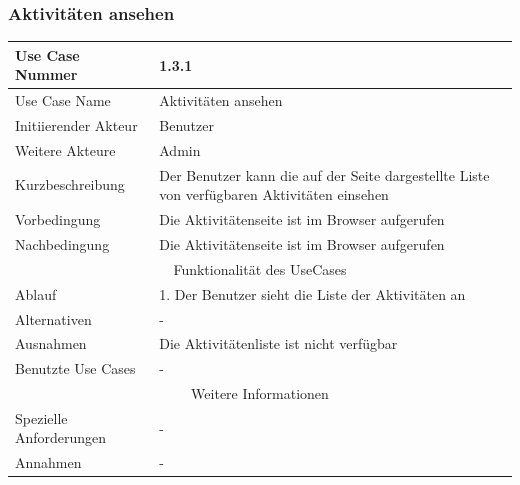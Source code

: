 \documentclass[10pt,a4paper]{article}
\begin{document}
	\subsubsection{Aktivit\"aten ansehen}
	\begin{tabular}{|l|p{.5\linewidth}|}
	\hline Use Case Nummer & 1.3.1 \\ 
	\hline Use Case Name & Aktivit\"aten ansehen \\ 
	\hline Initiierender Akteur & Benutzer \\
	\hline Weitere Akteure & Admin \\
	\hline Kurzbeschreibung & Der Benutzer kann die auf der Seite dargestellte Liste von verf\"ugbaren Aktivit\"aten einsehen \\
	\hline Vorbedingung & Die Aktivit\"atenseite ist im Browser aufgerufen \\
	\hline Nachbedingung & Die Aktivit\"atenseite ist im Browser aufgerufen \\
	\hline \multicolumn{2}{|c|}{Funktionalität des UseCases}\\
	\hline Ablauf & 1. Der Benutzer sieht die Liste der Aktivit\"aten an \\
	\hline Alternativen & - \\
	\hline Ausnahmen & Die Aktivit\"atenliste ist nicht verf\"ugbar \\
	\hline Benutzte Use Cases & - \\
	\hline \multicolumn{2}{|c|}{Weitere Informationen} \\
	\hline Spezielle Anforderungen & - \\
	\hline Annahmen & - \\
	\hline
	\end{tabular} 
\end{document}
